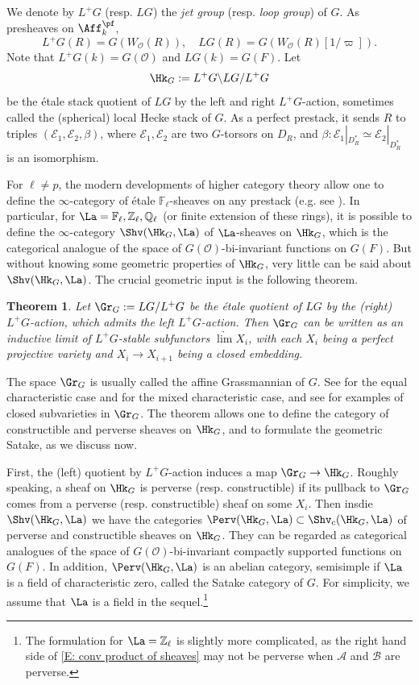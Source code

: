 \documentclass[11pt]{amsart}
\newtheorem{thm}{Theorem}[subsection]
\theoremstyle{definition}
\theoremstyle{definition}
\theoremstyle{definition}
\numberwithin{equation}{section}
\newcommand{\bF}{{\mathbb F}}
\newcommand{\bQ}{{\mathbb Q}}
\newcommand{\bZ}{{\mathbb Z}}
\newcommand{\mA}{{\mathcal A}}
\newcommand{\mB}{{\mathcal B}}
\newcommand{\mE}{{\mathcal E}}
\newcommand{\mO}{{\mathcal O}}
\begin{document}
We denote by $L^+G$ (resp. $LG$) the \emph{jet group} (resp. \emph{loop group}) of $G$. As presheaves on $\Aff_k^\pf$,
\begin{equation*}\label{E:jet and loop}
L^+G(R)=G(W_\mO(R)),\quad LG(R)=G(W_\mO(R)[1/\varpi]).
\end{equation*}
Note that $L^+G(k)=G(\mO)$ and $LG(k)=G(F)$. Let
\[
\Hk_G:=L^+G\backslash LG/L^+G
\]
be the \'etale stack quotient of $LG$ by the left and right $L^+G$-action, sometimes called the (spherical) local Hecke stack of $G$. As a perfect prestack, it sends $R$ to triples $(\mE_1,\mE_2,\beta)$, where $\mE_1,\mE_2$ are two $G$-torsors on $D_R$, and $\beta: \mE_1|_{D_R^*}\simeq \mE_2|_{D_R^*}$ is an isomorphism. 

For $\ell\neq p$,
the modern developments of higher category theory allow one to define the $\infty$-category of \'etale $\bF_\ell$-sheaves on any prestack (e.g. see \cite{Hemo-Zhu-Unipotent}). 
In particular, for $\La=\bF_\ell, \bZ_\ell, \bQ_\ell$ (or finite extension of these rings), it is possible to define the $\infty$-category $\Shv(\Hk_G,\La)$ of $\La$-sheaves on $\Hk_{G}$, which is the categorical analogue of the space of $G(\mO)$-bi-invariant functions on $G(F)$. But without knowing some geometric properties of $\Hk_{G}$, very little can be said about $\Shv(\Hk_G,\La)$. The crucial geometric input is the following theorem.
\begin{thm}\label{affGrass}
Let $\Gr_G:=LG/L^+G$ be the \'etale quotient of $LG$ by the (right) $L^+G$-action, which admits the left $L^+G$-action. Then $\Gr_G$ can be written as an inductive limit of $L^+G$-stable subfunctors $\underrightarrow\lim X_i$, with each $X_i$ being a perfect projective variety and $X_i\to X_{i+1}$ being a closed embedding. 
\end{thm}
The space $\Gr_G$ is usually called the affine Grassmannian of $G$. See  \cite{Beauville-Laszlo, Faltings-Loop} for the equal characteristic case and \cite{Zhu-Satake-Mixed, Bhatt-Scholze-Witt} for the mixed characteristic case, and see \cite{Zhu-PCMI, Zhu-CDM} for examples of closed subvarieties in $\Gr_G$.  The theorem allows one to define the category of constructible and perverse sheaves on $\Hk_G$, and to formulate the geometric Satake, as we discuss now.

First, the (left) quotient by $L^+G$-action induces a map $\Gr_G\to\Hk_G$. Roughly speaking, a sheaf on $\Hk_G$ is perverse (resp. constructible) if its pullback to $\Gr_G$ comes from a perverse (resp. constructible) sheaf on some $X_i$. Then insdie $\Shv(\Hk_G,\La)$ we have the categories $\Perv(\Hk_G,\La)\subset\Shv_{c}(\Hk_G,\La)$ of perverse and constructible sheaves on $\Hk_G$. 
They can be regarded as categorical analogues of the space of $G(\mO)$-bi-invariant compactly supported functions on $G(F)$.  In addition, $\Perv(\Hk_G,\La)$ is an abelian category, semisimple if $\La$ is a field of characteristic zero, called the Satake category of $G$. For simplicity, we assume that $\La$ is a field in the sequel.\footnote{The formulation for $\La=\bZ_\ell$ is slightly more complicated, as the right hand side of \eqref{E: conv product of sheaves} may not be perverse when $\mA$ and $\mB$ are perverse.}
\end{document}
